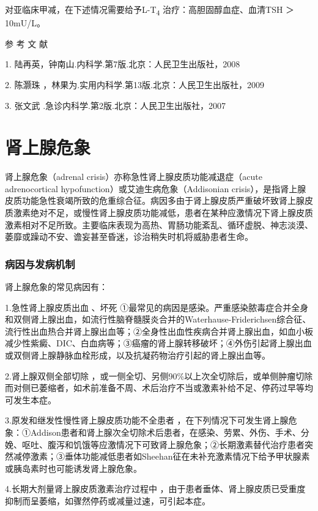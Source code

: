 对亚临床甲减，在下述情况需要给予L-T\textsubscript{4}
治疗：高胆固醇血症、血清TSH ＞ 10mU/L。
\protect\hypertarget{text00115.html}{}{}

\hypertarget{text00115.htmlux5cux23CHP4-10-4}{}
参 考 文 献

1. 陆再英，钟南山.内科学.第7版.北京：人民卫生出版社，2008

2. 陈灏珠 ，林果为.实用内科学.第13版.北京：人民卫生出版社，2009

3. 张文武 .急诊内科学.第2版.北京：人民卫生出版社，2007

\protect\hypertarget{text00116.html}{}{}

\chapter{肾上腺危象}

肾上腺危象（adrenal crisis）亦称急性肾上腺皮质功能减退症（acute
adrenocortical hypofunction）或艾迪生病危象（Addisonian
crisis），是指肾上腺皮质功能急性衰竭所致的危重综合征。病因多由于肾上腺皮质严重破坏致肾上腺皮质激素绝对不足，或慢性肾上腺皮质功能减低，患者在某种应激情况下肾上腺皮质激素相对不足所致。主要临床表现为高热、胃肠功能紊乱、循环虚脱、神志淡漠、萎靡或躁动不安、谵妄甚至昏迷，诊治稍失时机将威胁患者生命。

\subsection{病因与发病机制}

肾上腺危象的常见病因有：

1.急性肾上腺皮质出血 、坏死
①最常见的病因是感染。严重感染脓毒症合并全身和双侧肾上腺出血，如流行性脑脊髓膜炎合并的Waterhause-Friderichsen综合征、流行性出血热合并肾上腺出血等；②全身性出血性疾病合并肾上腺出血，如血小板减少性紫癜、DIC、白血病等；③癌瘤的肾上腺转移破坏；④外伤引起肾上腺出血或双侧肾上腺静脉血栓形成，以及抗凝药物治疗引起的肾上腺出血等。

2.肾上腺双侧全部切除
，或一侧全切、另侧90\%以上次全切除后，或单侧肿瘤切除而对侧已萎缩者，如术前准备不周、术后治疗不当或激素补给不足、停药过早等均可发生本症。

3.原发和继发性慢性肾上腺皮质功能不全患者
，在下列情况下可发生肾上腺危象：①Addison患者和肾上腺次全切除术后患者，在感染、劳累、外伤、手术、分娩、呕吐、腹泻和饥饿等应激情况下可致肾上腺危象；②长期激素替代治疗患者突然减停激素；③垂体功能减低患者如Sheehan征在未补充激素情况下给予甲状腺素或胰岛素时也可能诱发肾上腺危象。

4.长期大剂量肾上腺皮质激素治疗过程中
，由于患者垂体、肾上腺皮质已受重度抑制而呈萎缩，如骤然停药或减量过速，可引起本症。

